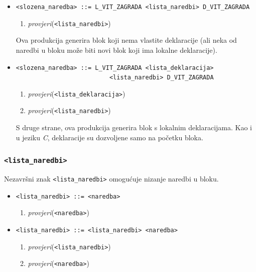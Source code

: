 \documentclass[times, 12pt, utf8]{book}
\begin{document}
\begin{itemize}

\item
\verb|<slozena_naredba> ::= L_VIT_ZAGRADA <lista_naredbi> D_VIT_ZAGRADA|
\begin{enumerate}
\item
\emph{provjeri}(\verb|<lista_naredbi>|)
\end{enumerate}

Ova produkcija generira blok koji nema vlastite deklaracije (ali neka od naredbi u bloku može biti novi blok koji ima lokalne deklaracije).

\item
\verb|<slozena_naredba> ::= L_VIT_ZAGRADA <lista_deklaracija>|\\
\verb|                          <lista_naredbi> D_VIT_ZAGRADA|
\begin{enumerate}
\item
\emph{provjeri}(\verb|<lista_deklaracija>|)
\item
\emph{provjeri}(\verb|<lista_naredbi>|)
\end{enumerate}

S druge strane, ova produkcija generira blok s lokalnim deklaracijama.
Kao i u jeziku \emph{C}, deklaracije su dozvoljene samo na početku bloka.

\end{itemize}

\subsubsection{\texttt{<lista\_naredbi>}}

Nezavršni znak \verb|<lista_naredbi>| omogućuje nizanje naredbi u bloku.

\begin{itemize}

\item
\verb|<lista_naredbi> ::= <naredba>|
\begin{enumerate}
\item
\emph{provjeri}(\verb|<naredba>|)
\end{enumerate}

\item
\verb|<lista_naredbi> ::= <lista_naredbi> <naredba>|
\begin{enumerate}
\item
\emph{provjeri}(\verb|<lista_naredbi>|)
\item
\emph{provjeri}(\verb|<naredba>|)
\end{enumerate}

\end{itemize}
\end{document}
